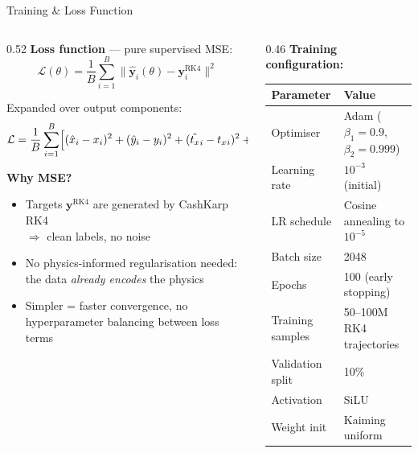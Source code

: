 \documentclass[aspectratio=169, 11pt]{beamer}
\newcommand{\bvec}[1]{\mathbf{#1}}
\newcommand{\tx}{t_x}
\newcommand{\ty}{t_y}
\begin{document}
\begin{frame}{Training \& Loss Function}

\begin{columns}[T]
\begin{column}{0.52\textwidth}
  \textbf{Loss function} --- pure supervised MSE:
  \begin{equation*}
    \boxed{\;
    \mathcal{L}(\theta) = \frac{1}{B}\sum_{i=1}^{B}
    \bigl\|\hat{\bvec{y}}_i(\theta) - \bvec{y}_i^\text{RK4}\bigr\|^2
    \;}
  \end{equation*}

  \vspace{4pt}
  Expanded over output components:
  \begin{equation*}
    \mathcal{L} = \frac{1}{B}\sum_{i=1}^{B}\Bigl[
      (\hat{x}_i - x_i)^2 + (\hat{y}_i - y_i)^2
      + (\hat{\tx}_i - \tx{}_i)^2 + (\hat{\ty}_i - \ty{}_i)^2
    \Bigr]
  \end{equation*}

  \vspace{6pt}
  \textbf{Why MSE?}
  \begin{itemize}\small
    \item Targets $\bvec{y}^\text{RK4}$ are generated by CashKarp RK4\\
          $\Rightarrow$ clean labels, no noise
    \item No physics-informed regularisation needed:\\
          the data \emph{already encodes} the physics
    \item Simpler = faster convergence, no hyperparameter
          balancing between loss terms
  \end{itemize}
\end{column}

\begin{column}{0.46\textwidth}
  \textbf{Training configuration:}
  \begin{table}
  \centering\scriptsize
  \begin{tabular}{@{} l l @{}}
    \toprule
    \textbf{Parameter} & \textbf{Value} \\
    \midrule
    Optimiser        & Adam ($\beta_1{=}0.9$, $\beta_2{=}0.999$) \\
    Learning rate    & $10^{-3}$ (initial) \\
    LR schedule      & Cosine annealing to $10^{-5}$ \\
    Batch size       & 2048 \\
    Epochs           & 100 (early stopping) \\
    Training samples & 50--100M RK4 trajectories \\
    Validation split & 10\% \\
    Activation       & SiLU \\
    Weight init      & Kaiming uniform \\
    \bottomrule
  \end{tabular}
  \end{table}


\end{column}
\end{columns}
\end{frame}
\end{document}
